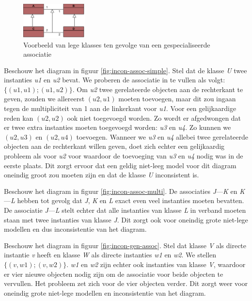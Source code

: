 \begin{figure}
	\centering
	\includegraphics[width=0.30\textwidth]{chap-consistentie/assoc-incon.png}
	\caption{Voorbeeld van lege klasses ten gevolge van een gespecialiseerde associatie}
	\label{fig:incon-assoc-spec}
\end{figure}

Beschouw het diagram in figuur \ref{fig:incon-assoc-simple}. Stel dat de klasse \textit{U} twee instanties \textit{u1} en \textit{u2} bevat. We proberen de associatie in te vullen als volgt: $\{(u1, u1); (u1, u2)\}$. Om \textit{u2} twee gerelateerde objecten aan de rechterkant te geven, zouden we allereerst $(u2, u1)$ moeten toevoegen, maar dit zou ingaan tegen de multipliciteit van 1 aan de linkerkant voor \textit{u1}. Voor een gelijkaardige reden kan $(u2, u2)$ ook niet toegevoegd worden. Zo wordt er afgedwongen dat er twee extra instanties moeten toegevoegd worden: \textit{u3} en \textit{u4}. Zo kunnen we $(u2, u3)$ en $(u2, u4)$ toevoegen. Wanneer we \textit{u3} en \textit{u4} allebei twee gerelateerde objecten aan de rechterkant willen geven, doet zich echter een gelijkaardig probleem als voor \textit{u2} voor waardoor de toevoeging van \textit{u3} en \textit{u4} nodig was in de eerste plaats. Dit zorgt ervoor dat een geldig niet-leeg model voor dit diagram oneindig groot zou moeten zijn en dat de klasse \textit{U} inconsistent is.

Beschouw het diagram in figuur \ref{fig:incon-assoc-multi}. De associaties \textit{J}---\textit{K} en \textit{K}---\textit{L} hebben tot gevolg dat \textit{J}, \textit{K} en \textit{L} exact even veel instanties moeten bevatten. De associatie \textit{J}---\textit{L} stelt echter dat alle instanties van klasse \textit{L} in verband moeten staan met twee instanties van klasse \textit{J}. Dit zorgt ook voor oneindig grote niet-lege modellen en dus inconsistentie van het diagram.

Beschouw het diagram in figuur \ref{fig:incon-gen-assoc}. Stel dat klasse \textit{V} als directe instantie \textit{v} heeft en klasse \textit{W} als directe instanties \textit{w1} en \textit{w2}. We stellen $\{(v, w1); (v, w2)\}$. \textit{w1} en \textit{w2} zijn echter ook instanties van klasse \textit{V}, waardoor er vier nieuwe objecten nodig zijn om de associatie voor beide objecten te vervullen. Het probleem zet zich voor de vier objecten verder. Dit zorgt weer voor oneindig grote niet-lege modellen en inconsistentie van het diagram.


